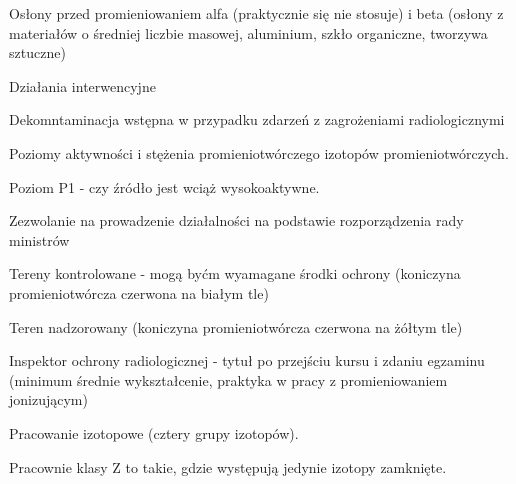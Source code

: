\documentclass{article}
\begin{document}
Osłony przed promieniowaniem alfa (praktycznie się nie stosuje) i beta (osłony z materiałów o średniej liczbie masowej, aluminium, szkło organiczne, tworzywa sztuczne)

Działania interwencyjne

Dekomntaminacja wstępna w przypadku zdarzeń z zagrożeniami radiologicznymi

Poziomy aktywności i stężenia promieniotwórczego izotopów promieniotwórczych.

Poziom P1 - czy źródło jest wciąż wysokoaktywne.

Zezwolanie na prowadzenie działalności na podstawie rozporządzenia rady ministrów

Tereny kontrolowane - mogą byćm wyamagane środki ochrony (koniczyna promieniotwórcza czerwona na białym tle)

Teren nadzorowany (koniczyna promieniotwórcza czerwona na żółtym tle)

Inspektor ochrony radiologicznej - tytuł po przejściu kursu i zdaniu egzaminu (minimum średnie wykształcenie, praktyka w pracy z promieniowaniem jonizującym)

Pracowanie izotopowe (cztery grupy izotopów).

Pracownie klasy Z to takie, gdzie występują jedynie izotopy zamknięte.
\end{document}
